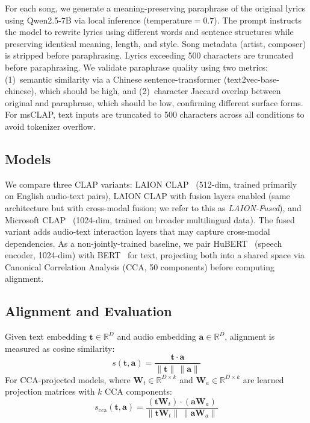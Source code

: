 \documentclass[11pt]{article}
\begin{document}
For each song, we generate a meaning-preserving paraphrase of the original lyrics using Qwen2.5-7B via local inference (temperature${=}0.7$). The prompt instructs the model to rewrite lyrics using different words and sentence structures while preserving identical meaning, length, and style. Song metadata (artist, composer) is stripped before paraphrasing. Lyrics exceeding 500 characters are truncated before paraphrasing. We validate paraphrase quality using two metrics: (1)~semantic similarity via a Chinese sentence-transformer (text2vec-base-chinese), which should be high, and (2)~character Jaccard overlap between original and paraphrase, which should be low, confirming different surface forms. For msCLAP, text inputs are truncated to 500 characters across all conditions to avoid tokenizer overflow.

\subsection{Models}

We compare three CLAP variants: LAION CLAP~\citep{wu2023clap} (512-dim, trained primarily on English audio-text pairs), LAION CLAP with fusion layers enabled (same architecture but with cross-modal fusion; we refer to this as \emph{LAION-Fused}), and Microsoft CLAP~\citep{elizalde2024msclap} (1024-dim, trained on broader multilingual data). The fused variant adds audio-text interaction layers that may capture cross-modal dependencies. As a non-jointly-trained baseline, we pair HuBERT~\citep{baevski2020wav2vec2} (speech encoder, 1024-dim) with BERT~\citep{devlin2019bert} for text, projecting both into a shared space via Canonical Correlation Analysis (CCA, 50 components) before computing alignment.

\subsection{Alignment and Evaluation}

Given text embedding $\mathbf{t} \in \mathbb{R}^D$ and audio embedding $\mathbf{a} \in \mathbb{R}^D$, alignment is measured as cosine similarity:
\begin{equation}\label{eq:cos}
s(\mathbf{t}, \mathbf{a}) = \frac{\mathbf{t} \cdot \mathbf{a}}{\|\mathbf{t}\| \, \|\mathbf{a}\|}
\end{equation}
For CCA-projected models, where $\mathbf{W}_t \in \mathbb{R}^{D \times k}$ and $\mathbf{W}_a \in \mathbb{R}^{D \times k}$ are learned projection matrices with $k$ CCA components:
\begin{equation}\label{eq:cca}
s_{\text{cca}}(\mathbf{t}, \mathbf{a}) = \frac{(\mathbf{t}\mathbf{W}_t) \cdot (\mathbf{a}\mathbf{W}_a)}{\|\mathbf{t}\mathbf{W}_t\| \, \|\mathbf{a}\mathbf{W}_a\|}
\end{equation}
\end{document}
